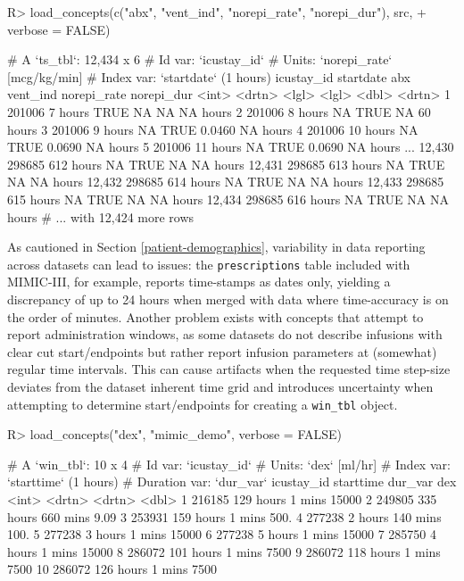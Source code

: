 \documentclass[
  notitle,
  nojss,
  noheadings]{jss}
\begin{document}
\begin{CodeChunk}
\begin{CodeInput}
R> load_concepts(c("abx", "vent_ind", "norepi_rate", "norepi_dur"), src,
+               verbose = FALSE)
\end{CodeInput}
\begin{CodeOutput}
# A `ts_tbl`: 12,434 x 6
# Id var:     `icustay_id`
# Units:      `norepi_rate` [mcg/kg/min]
# Index var:  `startdate` (1 hours)
       icustay_id startdate abx   vent_ind norepi_rate norepi_dur
            <int> <drtn>    <lgl> <lgl>          <dbl> <drtn>
     1     201006   7 hours TRUE  NA           NA      NA hours
     2     201006   8 hours NA    TRUE         NA      60 hours
     3     201006   9 hours NA    TRUE          0.0460 NA hours
     4     201006  10 hours NA    TRUE          0.0690 NA hours
     5     201006  11 hours NA    TRUE          0.0690 NA hours
   ...
12,430     298685 612 hours NA    TRUE         NA      NA hours
12,431     298685 613 hours NA    TRUE         NA      NA hours
12,432     298685 614 hours NA    TRUE         NA      NA hours
12,433     298685 615 hours NA    TRUE         NA      NA hours
12,434     298685 616 hours NA    TRUE         NA      NA hours
# ... with 12,424 more rows
\end{CodeOutput}
\end{CodeChunk}

As cautioned in Section \ref{patient-demographics}, variability in data
reporting across datasets can lead to issues: the \texttt{prescriptions}
table included with MIMIC-III, for example, reports time-stamps as dates
only, yielding a discrepancy of up to 24 hours when merged with data
where time-accuracy is on the order of minutes. Another problem exists
with concepts that attempt to report administration windows, as some
datasets do not describe infusions with clear cut start/endpoints but
rather report infusion parameters at (somewhat) regular time intervals.
This can cause artifacts when the requested time step-size deviates from
the dataset inherent time grid and introduces uncertainty when
attempting to determine start/endpoints for creating a \texttt{win\_tbl}
object.

\begin{CodeChunk}
\begin{CodeInput}
R> load_concepts("dex", "mimic_demo", verbose = FALSE)
\end{CodeInput}
\begin{CodeOutput}
# A `win_tbl`:  10 x 4
# Id var:       `icustay_id`
# Units:        `dex` [ml/hr]
# Index var:    `starttime` (1 hours)
# Duration var: `dur_var`
   icustay_id starttime dur_var       dex
        <int> <drtn>    <drtn>      <dbl>
 1     216185 129 hours   1 mins 15000
 2     249805 335 hours 660 mins     9.09
 3     253931 159 hours   1 mins   500.
 4     277238   2 hours 140 mins   100.
 5     277238   3 hours   1 mins 15000
 6     277238   5 hours   1 mins 15000
 7     285750   4 hours   1 mins 15000
 8     286072 101 hours   1 mins  7500
 9     286072 118 hours   1 mins  7500
10     286072 126 hours   1 mins  7500
\end{CodeOutput}
\end{CodeChunk}
\end{document}
